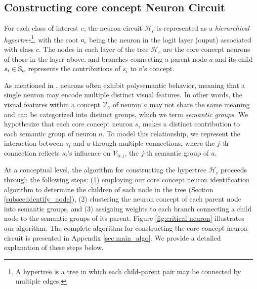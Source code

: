 \subsection{Constructing core concept Neuron Circuit}
\vspace{-5pt}
\label{sec:indentify_circuit}
For each class of interest \(c\), the neuron circuit $\mathcal{H}_c$ is represented as a \emph{hierarchical hypertree}\footnote{A hypertree is a tree in which each child-parent pair may be connected by multiple edges.}, with the root $a_c$ being the neuron in the logit layer (ouput) associated with class $c$. The nodes in each layer of the tree $\mathcal{H}_c$ are the core concept neurons of those in the layer above, and branches connecting a parent node $a$ and its child $s_i \in {\mathbb{S}}_a$ represents the contributions of $s_i$ to $a$'s concept. 

As mentioned in \citep{Olah, Polysemantic}, neurons often exhibit polysemantic behavior, meaning that a single neuron may encode multiple distinct visual features. In other words, the visual features within a concept $\mathcal{V}_a$ of neuron $a$ may not share the same meaning and can be categorized into distinct groups, which we term \emph{semantic groups}.
We hypothesize that each core concept neuron $s_i$ makes a distinct contribution to each semantic group of neuron $a$. To model this relationship, we represent the interaction between $s_i$ and $a$ through multiple connections, where the $j$-th connection reflects $s_i$'s influence on $\mathcal{V}_{a,j}$, the $j$-th semantic group of $a$. 

At a conceptual level, the algorithm for constructing the hypertree $\mathcal{H}_c$ proceeds through the following steps: (1) employing our core concept neuron identification algorithm to determine the children of each node in the tree (Section \ref{subsec:identify_node}), (2) clustering the neuron concept of each parent node into semantic groups, and (3) assigning weights to each branch connecting a child node to the semantic groups of its parent. 
Figure \ref{fig:critical neuron} illustrates our algorithm. 
The complete algorithm for constructing the core concept neuron circuit is presented in Appendix \ref{sec:main_algo}.
We provide a detailed explanation of these steps below.

